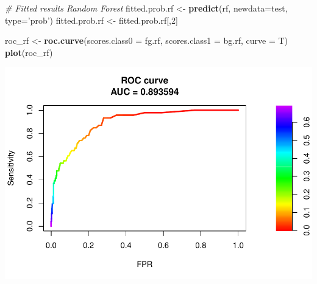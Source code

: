 \documentclass[]{article}
\newenvironment{Shaded}{\begin{snugshade}}{\end{snugshade}}
\newcommand{\CommentTok}[1]{\textcolor[rgb]{0.56,0.35,0.01}{\textit{#1}}}
\newcommand{\DataTypeTok}[1]{\textcolor[rgb]{0.13,0.29,0.53}{#1}}
\newcommand{\DecValTok}[1]{\textcolor[rgb]{0.00,0.00,0.81}{#1}}
\newcommand{\KeywordTok}[1]{\textcolor[rgb]{0.13,0.29,0.53}{\textbf{#1}}}
\newcommand{\NormalTok}[1]{#1}
\newcommand{\OperatorTok}[1]{\textcolor[rgb]{0.81,0.36,0.00}{\textbf{#1}}}
\newcommand{\StringTok}[1]{\textcolor[rgb]{0.31,0.60,0.02}{#1}}
\begin{document}
\begin{Shaded}
\begin{Highlighting}[]
\CommentTok{# Fitted results Random Forest}
\NormalTok{fitted.prob.rf <-}\StringTok{ }\KeywordTok{predict}\NormalTok{(rf, }\DataTypeTok{newdata=}\NormalTok{test, }\DataTypeTok{type=}\StringTok{'prob'}\NormalTok{) }
\NormalTok{fitted.prob.rf <-}\StringTok{ }\NormalTok{fitted.prob.rf[,}\DecValTok{2}\NormalTok{]}
\end{Highlighting}
\end{Shaded}

\begin{Shaded}
\end{Shaded}

\begin{Shaded}
\begin{Highlighting}[]
\NormalTok{roc_rf <-}\StringTok{ }\KeywordTok{roc.curve}\NormalTok{(}\DataTypeTok{scores.class0 =}\NormalTok{ fg.rf,}
                    \DataTypeTok{scores.class1 =}\NormalTok{ bg.rf,}
                    \DataTypeTok{curve =}\NormalTok{ T)}
\KeywordTok{plot}\NormalTok{(roc_rf)}
\end{Highlighting}
\end{Shaded}

\includegraphics{ml_analysis_lagged_with_imputation_files/figure-latex/unnamed-chunk-27-1.pdf}
\end{document}
